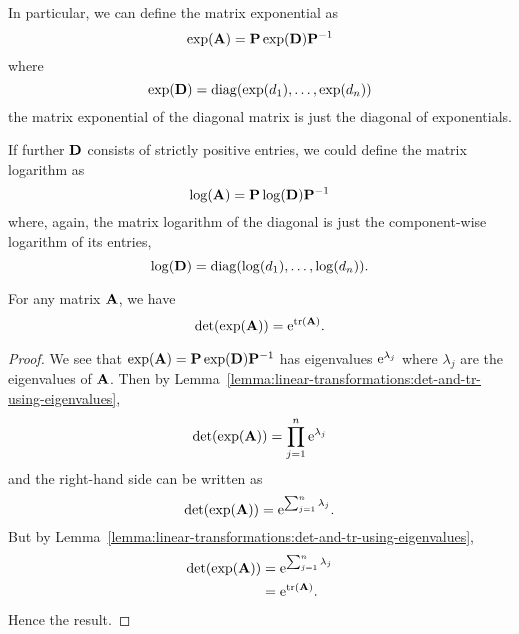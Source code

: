 In particular, we can define the matrix exponential as
\begin{equation}
\exp(\mathbf{A}) = \mathbf{P}\exp(\mathbf{D})\mathbf{P}^{-1}
\end{equation}
where
\begin{equation}
\exp(\mathbf{D}) = \operatorname{diag}(\exp(d_{1}), \dots, \exp(d_{n}))
\end{equation}
the matrix exponential of the diagonal matrix is just the diagonal of
exponentials.

If further $\mathbf{D}$ consists of strictly positive entries, we could
define the matrix logarithm as
\begin{equation}
\log(\mathbf{A}) = \mathbf{P}\log(\mathbf{D})\mathbf{P}^{-1}
\end{equation}
where, again, the matrix logarithm of the diagonal is just the
component-wise logarithm of its entries,
\begin{equation}
\log(\mathbf{D}) = \operatorname{diag}(\log(d_{1}), \dots, \log(d_{n})).
\end{equation}


\begin{theorem}
  For any matrix $\mathbf{A}$, we have
  \begin{equation}
\det(\exp(\mathbf{A})) = \mathrm{e}^{\mathop{\rm tr}\nolimits(\mathbf{A})}.
  \end{equation}
\end{theorem}
\begin{proof}
We see that $\exp(\mathbf{A})=\mathbf{P}\exp(\mathbf{D})\mathbf{P}^{-1}$ has
eigenvalues $\mathrm{e}^{\lambda_{j}}$ where $\lambda_{j}$ are the eigenvalues
of $\mathbf{A}$. Then by Lemma~\ref{lemma:linear-transformations:det-and-tr-using-eigenvalues},
\begin{equation}
\det(\exp(\mathbf{A})) = \prod^{n}_{j=1}\mathrm{e}^{\lambda_{j}}
\end{equation}
and the right-hand side can be written as
\begin{equation}
\det(\exp(\mathbf{A})) = \mathrm{e}^{\sum^{n}_{j=1}\lambda_{j}}.
\end{equation}
But by Lemma~\ref{lemma:linear-transformations:det-and-tr-using-eigenvalues},
\begin{equation}
  \begin{split}
    \det(\exp(\mathbf{A})) &= \mathrm{e}^{\sum^{n}_{j=1}\lambda_{j}}\\
    &= \mathrm{e}^{\mathop{\rm tr}\nolimits(\mathbf{A})}.
  \end{split}
\end{equation}
Hence the result.
\end{proof}

